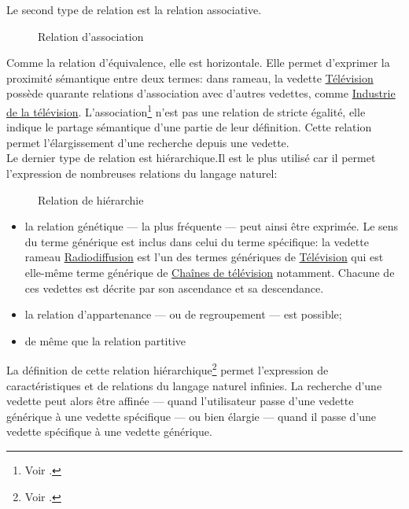 Le second type de relation est la relation associative. \begin{wrapfigure}{R}{5cm}
	\centering
	
	\caption{Relation d'association}
	\label{relation_association}	
\end{wrapfigure} Comme la relation d'équivalence, elle est horizontale. Elle permet d'exprimer la proximité sémantique entre deux termes: dans \ac{rameau}, la vedette \href{https://data.bnf.fr/fr/11933646/television/}{\og Télévision\fg{}} possède quarante relations d'association avec d'autres vedettes, comme \href{https://data.bnf.fr/fr/12648926/industrie_de_la_television/}{\og Industrie de la télévision\fg{}}. L'association\footnote{Voir .} n'est pas une relation de stricte égalité, elle indique le partage sémantique d'une partie de leur définition. Cette relation permet l'élargissement d'une recherche depuis une vedette.\\

Le dernier type de relation est hiérarchique.Il est le plus utilisé car il permet l'expression de nombreuses relations du langage naturel: \begin{wrapfigure}{L}{5cm}
	\centering
	
	\caption{Relation de hiérarchie}
	\label{relation_hierar}	
\end{wrapfigure}
\begin{itemize}
	\item la relation génétique --- la plus fréquente --- peut ainsi être exprimée. Le sens du terme générique est inclus dans celui du terme spécifique: la vedette \ac{rameau} \href{https://data.bnf.fr/fr/11960499/radiodiffusion/}{\og Radiodiffusion\fg{}} est l'un des termes génériques de  \href{https://data.bnf.fr/fr/11933646/television/}{\og Télévision\fg{}} qui est elle-même terme générique de \href{https://data.bnf.fr/fr/11936935/chaines_de_television/}{\og Chaînes de télévision\fg{}} notamment. Chacune de ces vedettes est décrite par son ascendance et sa descendance.
	\item la relation d'appartenance --- ou de regroupement --- est possible;
	\item de même que la relation partitive
\end{itemize}
La définition de cette relation hiérarchique\footnote{Voir .} permet l'expression de caractéristiques et de relations du langage naturel infinies. La recherche d'une vedette peut alors être affinée --- quand l'utilisateur passe d'une vedette générique à une vedette spécifique --- ou bien élargie --- quand il passe d'une vedette spécifique à une vedette générique.\\

